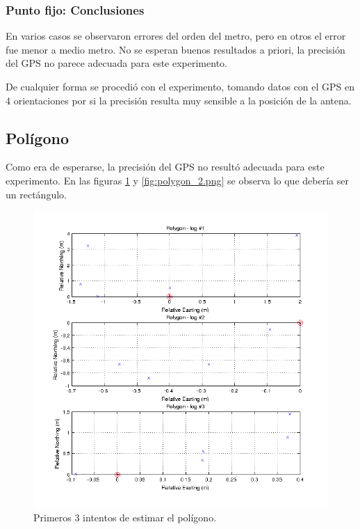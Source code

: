 \documentclass[spanish,12pt,a4paper,titlepage]{report}
\begin{document}
\subsubsection{Punto fijo: Conclusiones}
\label{sec:punto-fijo-conclusiones}

En varios casos se observaron errores del orden del metro, pero en otros el error fue menor a medio metro. No se esperan buenos resultados a priori, la precisión del GPS no parece adecuada para este experimento.

De cualquier forma se procedió con el experimento, tomando datos con el GPS en 4 orientaciones por si la precisión resulta muy sensible a la posición de la antena.

\newpage
\subsection{Polígono}
\label{sec:poligono}

Como era de esperarse, la precisión del GPS no resultó adecuada para este experimento. En las figuras \ref{fig:polygon_1.png} y \ref{fig:polygon_2.png} se observa lo que debería ser un rectángulo.

\begin{figure}[h!]
  \begin{center}
  \includegraphics[width=1\textwidth]{./img/polygon_1.png}
  \end{center}
  \caption{Primeros 3 intentos de estimar el polígono.}
  \label{fig:polygon_1.png}
\end{figure}
\end{document}
